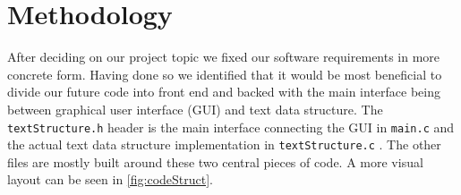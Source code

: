 \section{Methodology}\label{sec:meto}
After deciding on our project topic we fixed our software requirements in more concrete form. Having done so we identified that it would be most beneficial to divide our future code into front end and backed with the main interface being between graphical user interface (GUI) and text data structure. The \verb|textStructure.h| header is the main interface connecting the GUI in \verb|main.c| and the actual text data structure implementation in \verb|textStructure.c| \cite{GithubRepo}. The other files are mostly built around these two central pieces of code. A more visual layout can be seen in \ref{fig:codeStruct}.

